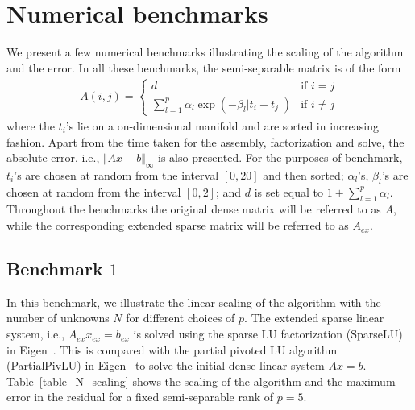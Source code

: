 \documentclass[final,leqno]{siamltex}
\begin{document}
\section{Numerical benchmarks}
\label{section_nb}
We present a few numerical benchmarks illustrating the scaling of the algorithm and the error. In all these benchmarks, the semi-separable matrix is of the form
\begin{align}
A(i,j) =
\begin{cases}
d & \text{if }i=j\\
\displaystyle \sum_{l=1}^p \alpha_l \exp\left(-\beta_l \lvert t_i-t_j\rvert\right) & \text{if }i \neq j
\end{cases}
\end{align}
where the $t_i$'s lie on a on-dimensional manifold and are sorted in increasing fashion. Apart from the time taken for the assembly, factorization and solve, the absolute error, i.e., $\Vert Ax-b \Vert_{\infty}$ is also presented. For the purposes of benchmark, $t_i$'s are chosen at random from the interval $[0,20]$ and then sorted; $\alpha_l$'s, $\beta_l$'s are chosen at random from the interval $[0,2]$; and $d$ is set equal to $1+\displaystyle \sum_{l=1}^p \alpha_l$. Throughout the benchmarks the original dense matrix will be referred to as $A$, while the corresponding extended sparse matrix will be referred to as $A_{ex}$.

\subsection{Benchmark $1$} 
In this benchmark, we illustrate the linear scaling of the algorithm with the number of unknowns $N$ for different choices of $p$. The extended sparse linear system, i.e., $A_{ex}x_{ex} = b_{ex}$ is solved using the sparse LU factorization (SparseLU) in Eigen~\cite{eigenweb}. This is compared with the partial pivoted LU algorithm (PartialPivLU) in Eigen~\cite{eigenweb} to solve the initial dense linear system $Ax=b$. Table~\ref{table_N_scaling} shows the scaling of the algorithm and the maximum error in the residual for a fixed semi-separable rank of $p=5$.
\end{document}
